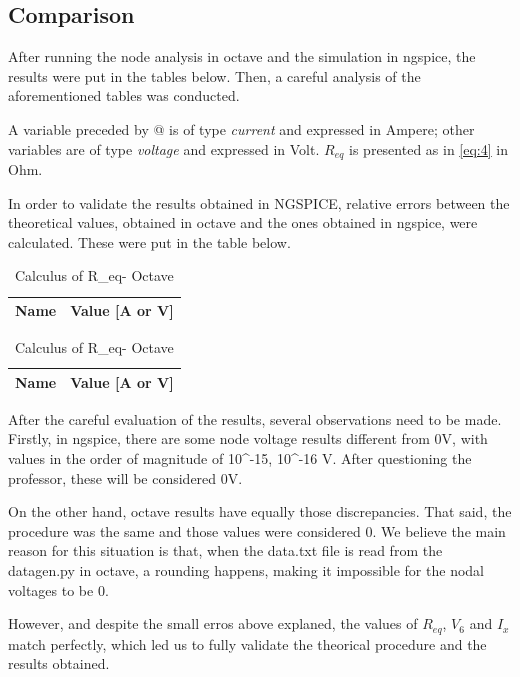 \subsection{Comparison}
After running the node analysis in octave and the simulation in ngspice, the results were put in the tables below. Then, a careful analysis of the aforementioned tables was conducted.

A variable preceded by @ is of type {\em current} and expressed in Ampere; other variables are of type {\it voltage} and expressed in
    Volt. $R_{eq}$ is presented as in \ref{eq:4} in Ohm.

In order to validate the results obtained in NGSPICE, relative errors between the theoretical values, obtained in octave and the ones obtained in ngspice, were calculated. These were put in the table below.

\begin{table}[ht]
\parbox{.30\linewidth}{
  \centering
  \begin{tabular}{|l|r|}
    \hline    
    {\bf Name} & {\bf Value [A or V]} \\ \hline
    
  \end{tabular}
  \caption{Simulation and Calculus of Req (NgSpice)}} 
\parbox{.30\linewidth}{
  \centering
  \begin{tabular}{|l|r|}
    \hline    
    {\bf Name} & {\bf Value [A or V]} \\ \hline
    
  \end{tabular}
  \caption{Calculus of R_{eq}- Octave}}
 
\end{table}

\par After the careful evaluation of the results, several observations need to be made. Firstly, in ngspice, there are some node voltage results different from 0V, with  values  in the order of magnitude of 10^-15, 10^-16 V. After questioning the professor, these will be considered 0V.

\par On the other hand, octave results have equally those discrepancies. That said, the procedure was the same and those values were considered 0. We believe the main reason for this situation is that, when the data.txt file is read from the datagen.py in octave, a rounding happens, making it impossible for the nodal voltages to be 0. 

\par However, and despite the small erros above explaned, the values of $R_{eq}$, $V_{6}$ and $I_{x}$ match perfectly, which led us to fully validate the theorical procedure and the results obtained.




 


